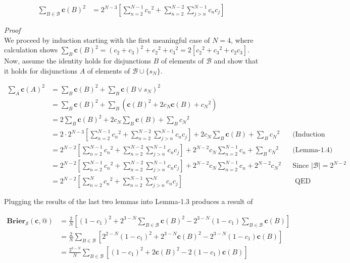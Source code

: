 \documentclass[
  10pt,
  letterpaper,
  DIV=11,
  numbers=noendperiod,
  twoside]{scrartcl}
\providecommand{\tightlist}{%
  \setlength{\itemsep}{0pt}\setlength{\parskip}{0pt}}\usepackage{longtable,booktabs,array}
\begin{document}
\begin{description}
\tightlist
\item[Lemma-1.5]
\[
  \begin{aligned}
  \sum_{B \in \mathscr{B}}\mathbf{c}(B)^2 &= 2^{N-3}[\sum_{n=2}^{N-1} c{_n}^2 + \sum_{n=2}^{N-2} \sum_{j>n}^{N-1}c_nc_j]
  \end{aligned}
  \]
\end{description}

\emph{Proof}\\
We proceed by induction starting with the first meaningful case of
\(N=4\), where calculation shows
\(\sum_B\mathbf{c}(B)^2 = (c_2 + c_3)^2 + c{_2}^2 + c{_3}^2 = 2[c{_2}^2 + c{_3}^2 + c_2c_3]\).
Now, assume the identity holds for disjunctions \(B\) of elements of
\(\mathscr{B}\) and show that it holds for disjunctions \(A\) of
elements of \(\mathscr{B}\cup \{s_N\}\).

\[
\begin{aligned}
\sum_A\mathbf{c}(A)^2 &= \sum_B\mathbf{c}(B)^2 + \sum_B\mathbf{c}(B \vee s_N)^2 \\
&= \sum_B\mathbf{c}(B)^2 + \sum_B(\mathbf{c}(B)^2 + 2c_N\mathbf{c}(B) + c{_N}^2)\\
&= 2\sum_B\mathbf{c}(B)^2 + 2c_N\sum_B\mathbf{c}(B) + \sum_Bc{_N}^2 \\
&= 2 \cdot 2^{N-3}[\sum_{n=2}^{N-1} c{_n}^2 + \sum_{n=2}^{N-2} \sum_{j>n}^{N-1}c_nc_j] + 2c_N\sum_B\mathbf{c}(B) + \sum_Bc{_N}^2 &&\text{(Induction Hypothesis)}\\
&= 2^{N-2}[\sum_{n=2}^{N-1} c{_n}^2 + \sum_{n=2}^{N-2} \sum_{j>n}^{N-1}c_nc_j] + 2^{N-2}c_N\sum_{n=2}^{N-1}c_n + \sum_Bc{_N}^2 &&\text{(Lemma-1.4)} \\
&= 2^{N-2}[\sum_{n=2}^{N-1} c{_n}^2 + \sum_{n=2}^{N-2} \sum_{j>n}^{N-1}c_nc_j] + 2^{N-2}c_N\sum_{n=2}^{N-1}c_n + 2^{N-2}c{_N}^2 &&\text{Since $|\mathscr{B}| = 2^{N-2}$} \\
&= 2^{N-2}[\sum_{n=2}^{N} c{_n}^2 + \sum_{n=2}^{N-1} \sum_{j>n}^{N}c_nc_j] && \text{ QED}
\end{aligned}
\]

Plugging the results of the last two lemmas into Lemma-1.3 produces a
result of

\[
\begin{aligned}
\mathbf{Brier}_{\mathscr{S}}(\textbf{c},@) &= \frac{2}{N}[(1-c_1)^2 + 2^{3-N}\sum_{B \in \mathscr{B}}\mathbf{c}(B)^2 - 2^{3-N}(1-c_1)\sum_{B \in \mathscr{B}}\mathbf{c}(B)] \\
&= \frac{2}{N}\sum_{B \in \mathscr{B}}[2^{2-N}(1-c_1)^2 + 2^{3-N}\mathbf{c}(B)^2 - 2^{3-N}(1-c_1)\mathbf{c}(B)] \\
&= \frac{2^{3-N}}{N}\sum_{B \in \mathscr{B}}[(1 - c_1)^2 + 2\mathbf{c}(B)^2 - 2(1-c_1)\mathbf{c}(B)]
\end{aligned}
\]
\end{document}
